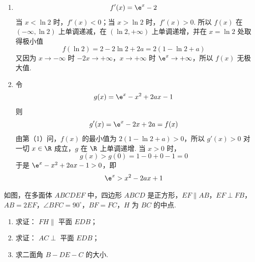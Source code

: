 \begin{solution}
\begin{enumerate}
\item
\[
f'(x)=\e^x-2
\]
当 \(x<\ln2\) 时，\(f'(x)<0\)；当 \(x>\ln2\) 时，\(f'(x)>0\). 所以 \(f(x)\) 在 \((-\infty,\ln2)\) 上单调递减，在 \((\ln2,+\infty)\) 上单调递增，并在 \(x=\ln2\) 处取得极小值
\[
f(\ln2)=2-2\ln2+2a=2(1-\ln2+a)
\]
又因为 \(x\to-\infty\) 时 \(-2x\to+\infty\)，\(x\to+\infty\) 时 \(\e^x\to+\infty\)，所以 \(f(x)\) 无极大值.
\item 令
\[
g(x)=\e^x-x^2+2ax-1
\]
则
\[
g'(x)=\e^x-2x+2a=f(x)
\]
由第（1）问，\(f(x)\) 的最小值为 \(2(1-\ln2+a)>0\)，所以 \(g'(x)>0\) 对一切 \(x\in\R\) 成立，\(g\) 在 \(\R\) 上单调递增. 当 \(x>0\) 时，
\[
g(x)>g(0)=1-0+0-1=0
\]
于是 \(\e^x-x^2+2ax-1>0\)，即
\[
\e^x>x^2-2ax+1
\]
\end{enumerate}
\end{solution}

\begin{problem}
如图，在多面体 \(ABCDEF\) 中，四边形 \(ABCD\) 是正方形，\(EF \parallel AB\)，\(EF \perp FB\)，\(AB = 2EF\)，\(\angle BFC = 90^\circ\)，\(BF = FC\)，\(H\) 为 \(BC\) 的中点.

\begin{enumerate}
\item 求证： \(FH \parallel\) 平面 \(EDB\)；
\item 求证： \(AC \perp\) 平面 \(EDB\)；
\item 求二面角 \(B - DE - C\) 的大小.
\end{enumerate}

\end{problem}

